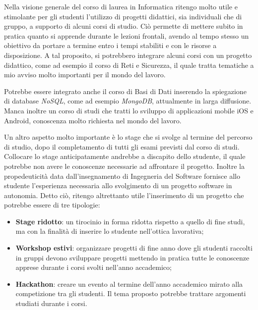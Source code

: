 \medskip

Nella visione generale del corso di laurea in Informatica ritengo molto utile e stimolante per gli studenti l'utilizzo di progetti didattici, sia individuali che di gruppo, a supporto di alcuni corsi di studio. Ciò permette di mettere subito in pratica quanto si apprende durante le lezioni frontali, avendo al tempo stesso un obiettivo da portare a termine entro i tempi stabiliti e con le risorse a disposizione. A tal proposito, si potrebbero integrare alcuni corsi con un progetto didattico, come ad esempio il corso di Reti e Sicurezza, il quale tratta tematiche a mio avviso molto importanti per il mondo del lavoro.

Potrebbe essere integrato anche il corso di Basi di Dati inserendo la spiegazione di database \textit{NoSQL}, come ad esempio \textit{MongoDB}, attualmente in larga diffusione.
Manca inoltre un corso di studi che tratti lo sviluppo di applicazioni mobile iOS e Android, conoscenza molto richiesta nel mondo del lavoro.

Un altro aspetto molto importante è lo stage che si svolge al termine del percorso di studio, dopo il completamento di tutti gli esami previsti dal corso di studi. Collocare lo stage anticipatamente andrebbe a discapito dello studente, il quale potrebbe non avere le conoscenze necessarie ad affrontare il progetto. Inoltre la propedeuticità data dall'insegnamento di Ingegneria del Software fornisce allo studente l'esperienza necessaria allo svolgimento di un progetto software in autonomia. Detto ciò, ritengo altrettanto utile l'inserimento di un progetto che potrebbe essere di tre tipologie:
\begin{itemize}
\item \textbf{Stage ridotto}: un tirocinio in forma ridotta rispetto a quello di fine studi, ma con la finalità di inserire lo studente nell'ottica lavorativa;
\item \textbf{Workshop estivi}: organizzare progetti di fine anno dove gli studenti raccolti in gruppi devono sviluppare progetti mettendo in pratica tutte le conoscenze apprese durante i corsi svolti nell'anno accademico;
\item \textbf{Hackathon}: creare un evento al termine dell'anno accademico mirato alla competizione tra gli studenti. Il tema proposto potrebbe trattare argomenti studiati durante i corsi.
\end{itemize}